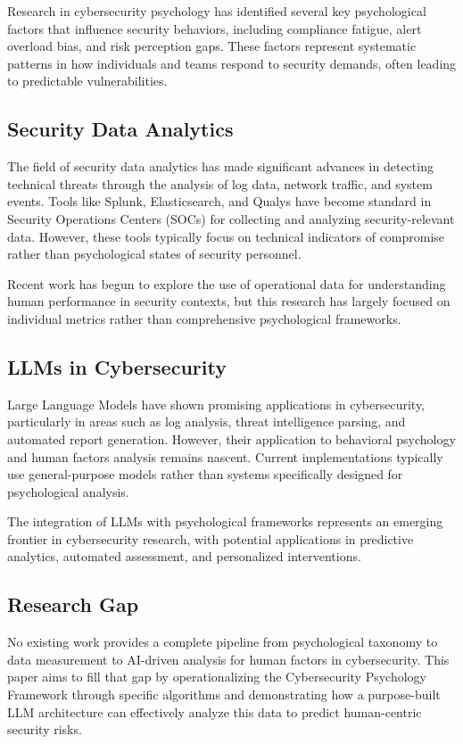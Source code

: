 \documentclass[11pt, a4paper]{article}
\begin{document}
Research in cybersecurity psychology has identified several key psychological factors that influence security behaviors, including compliance fatigue, alert overload bias, and risk perception gaps. These factors represent systematic patterns in how individuals and teams respond to security demands, often leading to predictable vulnerabilities.

\subsection{Security Data Analytics}
The field of security data analytics has made significant advances in detecting technical threats through the analysis of log data, network traffic, and system events. Tools like Splunk, Elasticsearch, and Qualys have become standard in Security Operations Centers (SOCs) for collecting and analyzing security-relevant data. However, these tools typically focus on technical indicators of compromise rather than psychological states of security personnel.

Recent work has begun to explore the use of operational data for understanding human performance in security contexts, but this research has largely focused on individual metrics rather than comprehensive psychological frameworks.

\subsection{LLMs in Cybersecurity}
Large Language Models have shown promising applications in cybersecurity, particularly in areas such as log analysis, threat intelligence parsing, and automated report generation. However, their application to behavioral psychology and human factors analysis remains nascent. Current implementations typically use general-purpose models rather than systems specifically designed for psychological analysis.

The integration of LLMs with psychological frameworks represents an emerging frontier in cybersecurity research, with potential applications in predictive analytics, automated assessment, and personalized interventions.

\subsection{Research Gap}
No existing work provides a complete pipeline from psychological taxonomy to data measurement to AI-driven analysis for human factors in cybersecurity. This paper aims to fill that gap by operationalizing the Cybersecurity Psychology Framework through specific algorithms and demonstrating how a purpose-built LLM architecture can effectively analyze this data to predict human-centric security risks.
\end{document}
